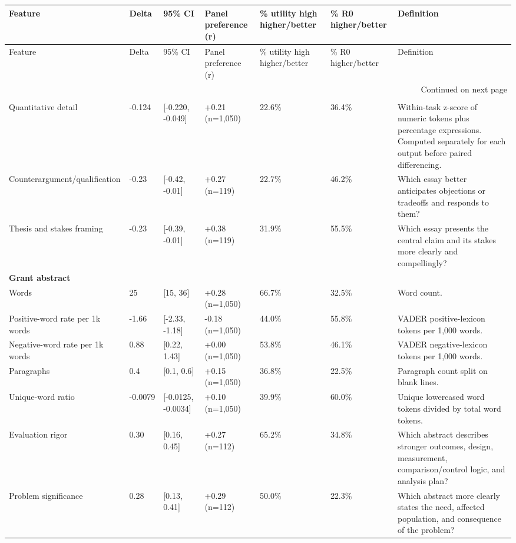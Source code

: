 \begin{longtable}{lllllll}
\toprule
Feature & Delta & 95\% CI & Panel preference (r) & \% utility high higher/better & \% R0 higher/better & Definition \\
\midrule
\endfirsthead
\toprule
Feature & Delta & 95\% CI & Panel preference (r) & \% utility high higher/better & \% R0 higher/better & Definition \\
\midrule
\endhead
\midrule
\multicolumn{7}{r}{Continued on next page} \\
\midrule
\endfoot
\bottomrule
\endlastfoot
\multicolumn{7}{l}{\textbf{Essay writing}} \\
Quantitative detail & -0.124 & [-0.220, -0.049] & +0.21 (n=1,050) & 22.6\% & 36.4\% & Within-task z-score of numeric tokens plus percentage expressions. Computed separately for each output before paired differencing. \\
Counterargument/qualification & -0.23 & [-0.42, -0.01] & +0.27 (n=119) & 22.7\% & 46.2\% & Which essay better anticipates objections or tradeoffs and responds to them? \\
Thesis and stakes framing & -0.23 & [-0.39, -0.01] & +0.38 (n=119) & 31.9\% & 55.5\% & Which essay presents the central claim and its stakes more clearly and compellingly? \\
\multicolumn{7}{l}{\textbf{Grant abstract}} \\
Words & 25 & [15, 36] & +0.28 (n=1,050) & 66.7\% & 32.5\% & Word count. \\
Positive-word rate per 1k words & -1.66 & [-2.33, -1.18] & -0.18 (n=1,050) & 44.0\% & 55.8\% & VADER positive-lexicon tokens per 1,000 words. \\
Negative-word rate per 1k words & 0.88 & [0.22, 1.43] & +0.00 (n=1,050) & 53.8\% & 46.1\% & VADER negative-lexicon tokens per 1,000 words. \\
Paragraphs & 0.4 & [0.1, 0.6] & +0.15 (n=1,050) & 36.8\% & 22.5\% & Paragraph count split on blank lines. \\
Unique-word ratio & -0.0079 & [-0.0125, -0.0034] & +0.10 (n=1,050) & 39.9\% & 60.0\% & Unique lowercased word tokens divided by total word tokens. \\
Evaluation rigor & 0.30 & [0.16, 0.45] & +0.27 (n=112) & 65.2\% & 34.8\% & Which abstract describes stronger outcomes, design, measurement, comparison/control logic, and analysis plan? \\
Problem significance & 0.28 & [0.13, 0.41] & +0.29 (n=112) & 50.0\% & 22.3\% & Which abstract more clearly states the need, affected population, and consequence of the problem? \\

\end{longtable}

